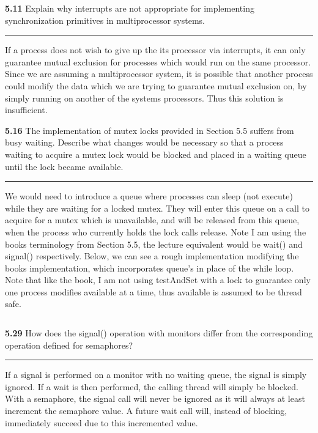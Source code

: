 \documentclass[12pt]{jhwhw}
\begin{document}
\textbf{5.11}  
	Explain why interrupts are not appropriate for implementing synchronization
	primitives in multiprocessor systems.
\textcolor[RGB]{240,240,240}{\rule{\textwidth}{0.5pt}}\bigbreak

	\begin{addmargin}[1em]{}
		If a process does not wish to give up the its processor via interrupts, it
		can only guarantee mutual exclusion for processes which would run on the
		same processor. Since we are assuming a multiprocessor system, it is possible
		that another process could modify the data which we are trying to guarantee mutual
		exclusion on, by simply running on another of the systems processors.
		Thus this solution is insufficient.
	\end{addmargin}
	\bigbreak

\textbf{5.16}  
	The implementation of mutex locks provided in Section 5.5 suffers
	from busy waiting. Describe what changes would be necessary so that a process 
	waiting to acquire a mutex lock would be blocked and placed in a waiting queue
	until the lock became available.
\textcolor[RGB]{240,240,240}{\rule{\textwidth}{0.5pt}}\bigbreak

	\begin{addmargin}[1em]{}
		We would need to introduce a queue where processes can sleep (not execute)
		while they are waiting for a locked mutex. They will enter this queue
		on a call to acquire for a mutex which is unavailable, and will be released
		from this queue, when the process who currently holds the lock calls release.
		Note I am using the books terminology from Section 5.5, the lecture equivalent
		would be wait() and signal() respectively.
		Below, we can see a rough implementation modifying the books implementation,
		which incorporates queue's in place of the while loop.
		Note that like the book, I am not using testAndSet with a lock to guarantee
		only one process modifies available at a time, thus available is assumed to 
		be thread safe.

		\inputminted{c}{5.16.c}
	\end{addmargin}
	\bigbreak

\textbf{5.29}  
	How does the signal() operation with monitors differ from the corresponding
	operation defined for semaphores?
\textcolor[RGB]{240,240,240}{\rule{\textwidth}{0.5pt}}\bigbreak

	\begin{addmargin}[1em]{}
		If a signal is performed on a monitor with no waiting queue, the signal is
		simply ignored. If a wait is then performed, the calling thread will simply
		be blocked. With a semaphore, the signal call will never be ignored as it will
		always at least increment the semaphore value. A future wait call will, instead
		of blocking, immediately succeed due to this incremented value.
	\end{addmargin}
	\bigbreak
\end{document}
